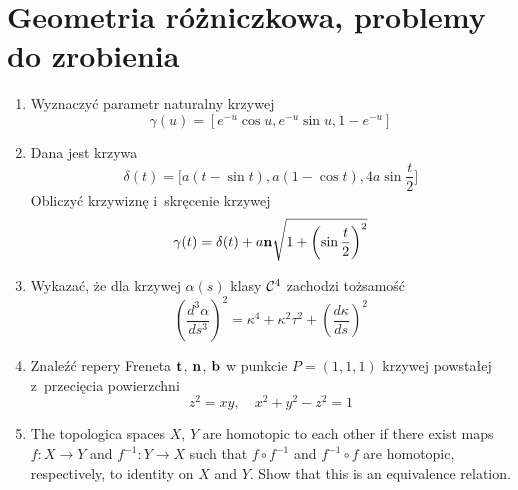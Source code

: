 \documentclass[a4paper,11pt]{article}
\begin{document}
\section{Geometria różniczkowa, problemy do zrobienia}





\begin{enumerate}

\item Wyznaczyć parametr naturalny krzywej
  \begin{equation}
    \label{DiffGeo:01}
    \gamma( u ) = \left[ e^{ -u } \cos u, e^{ -u } \sin u, 1 - e^{ -u } \right]
  \end{equation}

\item Dana jest krzywa
  \begin{equation}
    \label{DiffGeo:02}
    \delta( t ) =
    \big[ a ( t - \sin t ), a ( 1 - \cos t ), 4a \sin \frac{ t }{ 2 } \big]
  \end{equation}
  Obliczyć krzywiznę i~skręcenie krzywej
  \begin{equation}
    \label{DiffGeo:03}
    \gamma( t ) =
    \delta( t )
    + a \mathbf{n} \sqrt{ 1 + \left( \sin \frac{ t }{ 2 } \right)^{ 2 } }
  \end{equation}

\item Wykazać, że dla krzywej $\alpha( s )$ klasy $\mathcal{C}^{ 4 }$ zachodzi
  tożsamość
  \begin{equation}
    \label{DiffGeo:04}
    \left( \frac{ d^{ 3 } \alpha }{ d s^{ 3 } } \right)^{ 2 }
    =
    \kappa^{ 4 } + \kappa^{ 2 } \tau^{ 2 } + \left( \frac{ d \kappa }{ d s } \right)^{ 2 }
  \end{equation}

\item Znaleźć repery Freneta $\mathbf{t}$, $\mathbf{n}$, $\mathbf{b}$ w
  punkcie $P = (1, 1, 1)$ krzywej powstałej z~przecięcia powierzchni
  \begin{equation}
    \label{DiffGeo:05}
    z^{ 2 } = xy, \quad
    x^{ 2 } + y^{ 2 } - z^{ 2 } = 1
  \end{equation}

\item The topologica spaces $X$, $Y$ are homotopic to each other if
  there exist maps $f : X \to Y$ and $f^{ -1 } : Y \to X$ such that
  $f \circ f^{ -1 }$ and $f^{ -1 } \circ f$ are homotopic,
  respectively, to identity on $X$ and $Y$. Show that this is an
  equivalence relation.


\end{enumerate}
\end{document}
